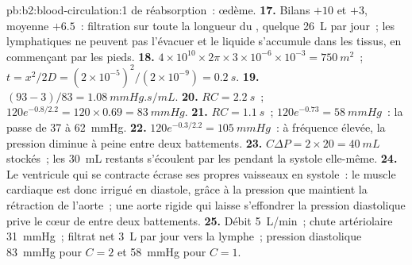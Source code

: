 \begin{solution}{pb:b2:blood-circulation:1}
de réabsorption~: œdème.
\textbf{17.} Bilans $+10$ et $+3$, moyenne $+6.5$~: filtration sur toute
la longueur du , quelque \qty{26}{L} par jour~; les
lymphatiques ne peuvent pas l'évacuer et le liquide s'accumule dans les
tissus, en commençant par les pieds.
\textbf{18.} $4\times 10^{10}\times 2\pi\times 3\times 10^{-6}\times
10^{-3} = \qty{750}{m^2}$~; $t = x^{2}/2D = (2\times 10^{-5})^{2}/
(2\times 10^{-9}) = \qty{0.2}{s}$.
\textbf{19.} $(93 - 3)/83 = \qty{1.08}{mmHg.s/mL}$.
\textbf{20.} $RC = \qty{2.2}{s}$~; $120e^{-0.8/2.2} = 120\times 0.69 =
\qty{83}{mmHg}$.
\textbf{21.} $RC = \qty{1.1}{s}$~; $120e^{-0.73} = \qty{58}{mmHg}$~: la
 passe de 37 à \qty{62}{mmHg}.
\textbf{22.} $120e^{-0.3/2.2} = \qty{105}{mmHg}$~: à fréquence élevée, la
pression diminue à peine entre deux battements.
\textbf{23.} $C\Delta P = 2\times 20 = \qty{40}{mL}$ stockés~; les
\qty{30}{mL} restants s'écoulent par les  pendant la systole
elle-même.
\textbf{24.} Le ventricule qui se contracte écrase ses propres vaisseaux
en systole~: le muscle cardiaque est donc irrigué en diastole, grâce à
la pression que maintient la rétraction de l'aorte~; une aorte rigide
qui laisse s'effondrer la pression diastolique prive le cœur de 
entre deux battements.
\textbf{25.} Débit \qty{5}{L/min}~; chute artériolaire \qty{31}{mmHg}~;
filtrat net \qty{3}{L} par jour vers la lymphe~; pression diastolique
\qty{83}{mmHg} pour $C = 2$ et \qty{58}{mmHg} pour $C = 1$.
\end{solution}
